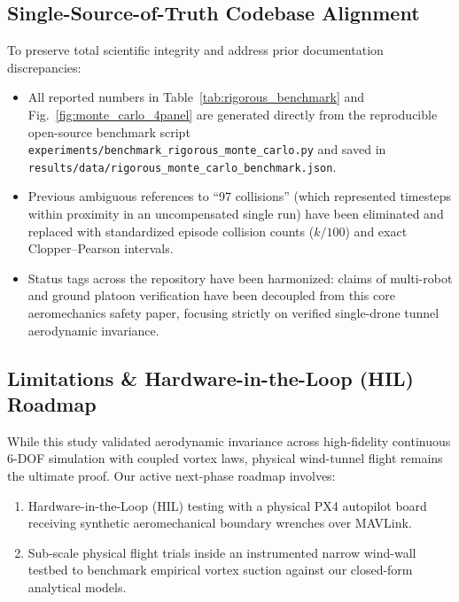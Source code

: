 \documentclass[11pt,a4paper]{article}
\begin{document}
\subsection{Single-Source-of-Truth Codebase Alignment}
To preserve total scientific integrity and address prior documentation discrepancies:
\begin{itemize}[leftmargin=16pt, itemsep=2pt]
    \item All reported numbers in Table~\ref{tab:rigorous_benchmark} and Fig.~\ref{fig:monte_carlo_4panel} are generated directly from the reproducible open-source benchmark script \texttt{experiments/benchmark\_rigorous\_monte\_carlo.py} and saved in \texttt{results/data/rigorous\_monte\_carlo\_benchmark.json}.
    \item Previous ambiguous references to ``97 collisions'' (which represented timesteps within proximity in an uncompensated single run) have been eliminated and replaced with standardized episode collision counts ($k/100$) and exact Clopper--Pearson intervals.
    \item Status tags across the repository have been harmonized: claims of multi-robot and ground platoon verification have been decoupled from this core aeromechanics safety paper, focusing strictly on verified single-drone tunnel aerodynamic invariance.
\end{itemize}

\subsection{Limitations \& Hardware-in-the-Loop (HIL) Roadmap}
While this study validated aerodynamic invariance across high-fidelity continuous 6-DOF simulation with coupled vortex laws, physical wind-tunnel flight remains the ultimate proof. Our active next-phase roadmap involves:
\begin{enumerate}[leftmargin=16pt, itemsep=2pt]
    \item Hardware-in-the-Loop (HIL) testing with a physical PX4 autopilot board receiving synthetic aeromechanical boundary wrenches over MAVLink.
    \item Sub-scale physical flight trials inside an instrumented narrow wind-wall testbed to benchmark empirical vortex suction against our closed-form analytical models.
\end{enumerate}
\end{document}
